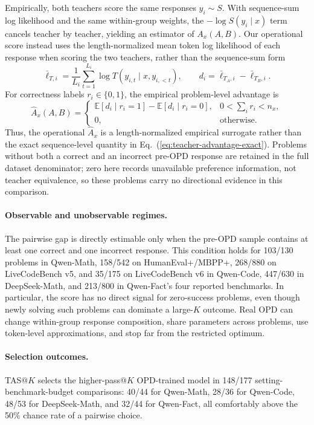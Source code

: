 \documentclass{article}
\theoremstyle{opdplain}
\begin{document}
Empirically, both teachers score the same responses $y_i\sim S$. With sequence-sum log likelihood and the same within-group weights, the $-\log S(y_i\mid x)$ term cancels teacher by teacher, yielding an estimator of $A_x(A,B)$. Our operational score instead uses the length-normalized mean token log likelihood of each response when scoring the two teachers, rather than the sequence-sum form
\[
    \bar{\ell}_{T,i}=\frac{1}{L_i}\sum_{t=1}^{L_i}\log T(y_{i,t}\mid x,y_{i,<t}),
    \qquad d_i=\bar{\ell}_{T_A,i}-\bar{\ell}_{T_B,i}.
\]
For correctness labels $r_i\in\{0,1\}$, the empirical problem-level advantage is
\begin{equation}
    \widehat A_x(A,B)
    =\begin{cases}
    \mathbb E[d_i\mid r_i=1]-\mathbb E[d_i\mid r_i=0],
      &0<\sum_i r_i<n_x,\\
    0, &\text{otherwise}.
    \end{cases}
    \label{eq:teacher-advantage}
\end{equation}
Thus, the operational $\widehat A_x$ is a length-normalized empirical surrogate rather than the exact sequence-level quantity in Eq.~(\ref{eq:teacher-advantage-exact}). Problems without both a correct and an incorrect pre-OPD response are retained in the full dataset denominator; zero here records unavailable preference information, not teacher equivalence, so these problems carry no directional evidence in this comparison.

\paragraph{Observable and unobservable regimes.}
The pairwise gap is directly estimable only when the pre-OPD sample contains at least one correct and one incorrect response.
This condition holds for 103/130 problems in Qwen-Math, 158/542 on HumanEval+/MBPP+, 268/880 on LiveCodeBench v5, and 35/175 on LiveCodeBench v6 in Qwen-Code, 447/630 in DeepSeek-Math, and 213/800 in Qwen-Fact's four reported benchmarks.
In particular, the score has no direct signal for zero-success problems, even though newly solving such problems can dominate a large-$K$ outcome.
Real OPD can change within-group response composition, share parameters across problems, use token-level approximations, and stop far from the restricted optimum.

\paragraph{Selection outcomes.}
TAS@$K$ selects the higher-pass@$K$ OPD-trained model in 148/177 setting-benchmark-budget comparisons: 40/44 for Qwen-Math, 28/36 for Qwen-Code, 48/53 for DeepSeek-Math, and 32/44 for Qwen-Fact, all comfortably above the 50\% chance rate of a pairwise choice.
\end{document}

